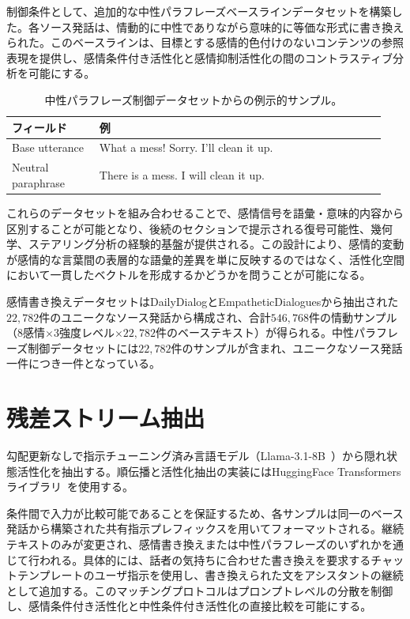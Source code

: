制御条件として、追加的な中性パラフレーズベースラインデータセットを構築した。各ソース発話は、情動的に中性でありながら意味的に等価な形式に書き換えられた。このベースラインは、目標とする感情的色付けのないコンテンツの参照表現を提供し、感情条件付き活性化と感情抑制活性化の間のコントラスティブ分析を可能にする。\par

\begin{table}[H]
\centering
\small
\begin{tabular}{p{0.22\linewidth} p{0.72\linewidth}}
\toprule
\textbf{フィールド} & \textbf{例} \\
\midrule
Base utterance & What a mess!  Sorry. I'll clean it up. \\
Neutral paraphrase & There is a mess. I will clean it up. \\
\bottomrule
\end{tabular}
\caption{中性パラフレーズ制御データセットからの例示的サンプル。}
\label{tab:neutral_rewrite_example}
\end{table}

これらのデータセットを組み合わせることで、感情信号を語彙・意味的内容から区別することが可能となり、後続のセクションで提示される復号可能性、幾何学、ステアリング分析の経験的基盤が提供される。この設計により、感情的変動が感情的な言葉間の表層的な語彙的差異を単に反映するのではなく、活性化空間において一貫したベクトルを形成するかどうかを問うことが可能になる。\par

感情書き換えデータセットはDailyDialogとEmpatheticDialoguesから抽出された$22{,}782$件のユニークなソース発話から構成され、合計$546{,}768$件の情動サンプル（$8$感情$\times$$3$強度レベル$\times$$22{,}782$件のベーステキスト）が得られる。中性パラフレーズ制御データセットには$22{,}782$件のサンプルが含まれ、ユニークなソース発話一件につき一件となっている。

\section{残差ストリーム抽出}
\label{sec:residual_extraction}

勾配更新なしで指示チューニング済み言語モデル（Llama-3.1-8B~\cite{meta2024llama318b}）から隠れ状態活性化を抽出する。順伝播と活性化抽出の実装にはHuggingFace Transformersライブラリ~\cite{wolf2020huggingfacestransformersstateoftheartnatural}を使用する。

条件間で入力が比較可能であることを保証するため、各サンプルは同一のベース発話から構築された共有指示プレフィックスを用いてフォーマットされる。継続テキストのみが変更され、感情書き換えまたは中性パラフレーズのいずれかを通じて行われる。具体的には、話者の気持ちに合わせた書き換えを要求するチャットテンプレートのユーザ指示を使用し、書き換えられた文をアシスタントの継続として追加する。このマッチングプロトコルはプロンプトレベルの分散を制御し、感情条件付き活性化と中性条件付き活性化の直接比較を可能にする。

